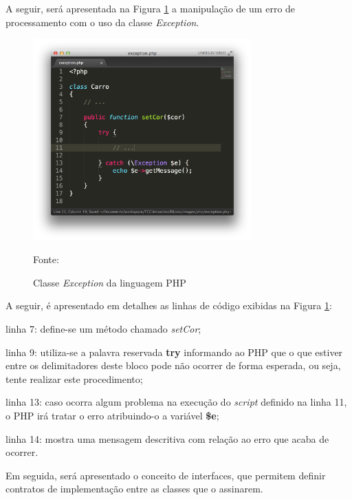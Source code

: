 \FloatBarrier 	%


A seguir, será apresentada na Figura \ref{fig:excecao} a manipulação de um erro de
processamento com o uso da classe \textit{Exception}.

\begin{figure}[h!tb]
	\caption{Classe \textit{Exception} da linguagem PHP}
	\label{fig:excecao}

	\centering
	\includegraphics[width=0.75\textwidth]{images/exception.png}

	\centering
	\footnotesize Fonte: \fonteOAutor
\end{figure}

\FloatBarrier 	%

A seguir, é apresentado em detalhes as linhas de código exibidas na Figura
\ref{fig:excecao}:

\begin{alineas}
    \item linha 7: define-se um método chamado \textit{setCor};
    \item linha 9: utiliza-se a palavra reservada \textbf{try} informando ao
    \acs{PHP} que o que estiver entre os delimitadores deste bloco pode não
    ocorrer de forma esperada, ou seja, tente realizar este procedimento;
    \item linha 13: caso ocorra algum problema na execução do \textit{script}
    definido na linha 11, o \acs{PHP} irá tratar o erro atribuindo-o a variável
    \textbf{\$e};
    \item linha 14: mostra uma mensagem descritiva com relação ao erro que acaba
    de ocorrer.
\end{alineas}

Em seguida, será apresentado o conceito de interfaces, que permitem definir
contratos de implementação entre as classes que o assinarem.
